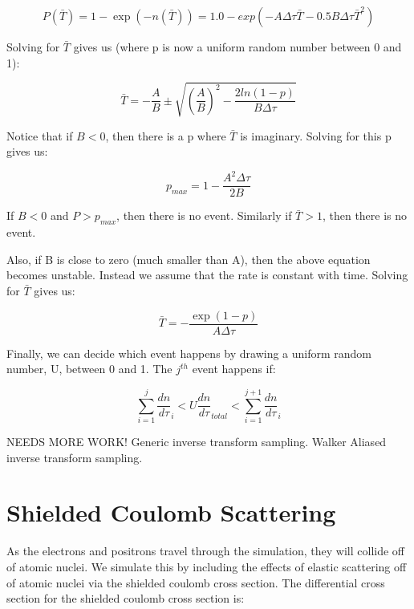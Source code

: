 \documentclass[]{article}
\begin{document}
\begin{equation}
P(\bar{T})=1-\exp(-n(\bar{T}))=1.0-exp(-A\Delta \tau \bar{T} - 0.5B\Delta \tau\bar{T}^2)
\end{equation}

Solving for $\bar{T}$ gives us (where p is now a uniform random number between 0 and 1):

\begin{equation}
\bar{T}=-\frac{A}{B} \pm \sqrt{\left( \frac{A}{B} \right)^2 -\frac{2ln(1-p)}{B\Delta \tau} }
\end{equation}

Notice that if $B<0$, then there is a p where $\bar{T}$ is imaginary. Solving for this p gives us:

\begin{equation}
p_{max}=1-\frac{A^2\Delta \tau}{2B}
\end{equation}

If $B<0$ and $P>p_{max}$, then there is no event. Similarly if $\bar{T}>1$, then there is no event.

Also, if B is close to zero (much smaller than A), then the above equation becomes unstable. Instead we assume that the rate is constant with time. Solving for $\bar{T}$ gives us:

\begin{equation}
\bar{T}=-\frac{\exp(1-p)}{A\Delta \tau}
\end{equation}

Finally, we can decide which event happens by drawing a uniform random number, U, between 0 and 1. The $j^{th}$ event happens if:

\begin{equation}
\sum_{i=1}^{j}\frac{dn}{d\tau}_{i} < U\frac{dn}{d\tau}_{total} < \sum_{i=1}^{j+1}\frac{dn}{d\tau}_{i}
\end{equation}

NEEDS MORE WORK! Generic inverse transform sampling. Walker Aliased inverse transform sampling.

\section{Shielded Coulomb Scattering}

As the electrons and positrons travel through the simulation, they will collide off of atomic nuclei. We simulate this by including the effects of elastic scattering off of atomic nuclei via the shielded coulomb cross section. The differential cross section for the shielded coulomb cross section is:
\end{document}
